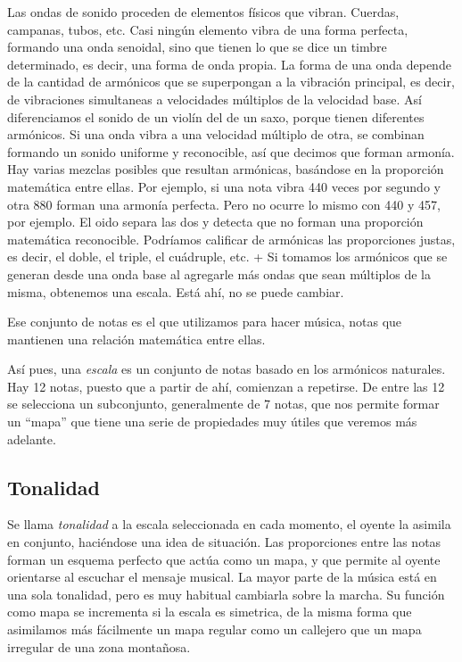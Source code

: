 \documentclass[]{article}
\begin{document}
Las ondas de sonido proceden de elementos físicos que vibran. Cuerdas, campanas, tubos, etc. Casi ningún elemento vibra de una forma perfecta, formando una onda senoidal, sino que tienen lo que se dice un timbre determinado, es decir, una forma de onda propia. La forma de una onda depende de la cantidad de armónicos que se superpongan a la vibración principal, es decir, de vibraciones simultaneas a velocidades múltiplos de la velocidad base. Así diferenciamos el sonido de un violín del de un saxo, porque tienen diferentes armónicos. Si una onda vibra a una velocidad múltiplo de otra, se combinan formando un sonido uniforme y reconocible, así que decimos que forman armonía. Hay varias mezclas posibles que resultan armónicas, basándose en la proporción matemática entre ellas. Por ejemplo, si una nota vibra 440 veces por segundo y otra 880 forman una armonía perfecta. Pero no ocurre lo mismo con 440 y 457, por ejemplo. El oido separa las dos y detecta que no forman una proporción matemática reconocible. Podríamos calificar de armónicas las proporciones justas, es decir, el doble, el triple, el cuádruple, etc. + Si tomamos los armónicos que se generan desde una onda base al agregarle más ondas que sean múltiplos de la misma, obtenemos una escala. Está ahí, no se puede cambiar.

Ese conjunto de notas es el que utilizamos para hacer música, notas que mantienen una relación matemática entre ellas.

Así pues, una \emph{escala} es un conjunto de notas basado en los armónicos naturales. Hay 12 notas, puesto que a partir de ahí, comienzan a repetirse. De entre las 12 se selecciona un subconjunto, generalmente de 7 notas, que nos permite formar un ``mapa'' que tiene una serie de propiedades muy útiles que veremos más adelante.

\subsection{Tonalidad}

Se llama \emph{tonalidad} a la escala seleccionada en cada momento, el oyente la asimila en conjunto, haciéndose una idea de situación. Las proporciones entre las notas forman un esquema perfecto que actúa como un mapa, y que permite al oyente orientarse al escuchar el mensaje musical. La mayor parte de la música está en una sola tonalidad, pero es muy habitual cambiarla sobre la marcha. Su función como mapa se incrementa si la escala es simetrica, de la misma forma que asimilamos más fácilmente un mapa regular como un callejero que un mapa irregular de una zona montañosa.
\end{document}
